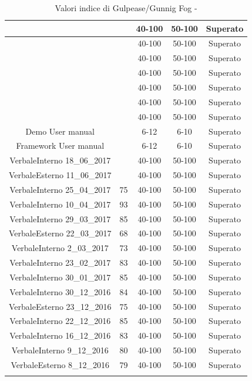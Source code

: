 \begin{longtable}{|c|c|c|c|c|}
	\hline \NormeDiProgetto{} &  & 40-100 & 50-100 & Superato\\
	\hline \PianoDiProgetto{} &  & 40-100 & 50-100 & Superato \\
	\hline \PianoDiQualifica{} &  & 40-100 & 50-100 & Superato \\
	\hline \AnalisiDeiRequisiti{} &  & 40-100 & 50-100 & Superato \\
	\hline \Glossario{} &  & 40-100 & 50-100 & Superato \\
	\hline \SpecificaTecnica{} &  & 40-100 & 50-100 & Superato\\
	\hline \DefinizioneDiProdotto{} &  & 40-100 & 50-100 & Superato\\
	\hline Demo User manual &  & 6-12 & 6-10 & Superato\\
	\hline Framework User manual &  & 6-12 & 6-10 & Superato\\
	\hline VerbaleInterno 18\_06\_2017 &  & 40-100 & 50-100 & Superato \\
	\hline VerbaleEsterno 11\_06\_2017 &  & 40-100 & 50-100 & Superato \\
	\hline VerbaleInterno 25\_04\_2017 & 75 & 40-100 & 50-100 & Superato \\
	\hline VerbaleInterno 10\_04\_2017 & 93 & 40-100 & 50-100 & Superato \\
	\hline VerbaleInterno 29\_03\_2017 & 85 & 40-100 & 50-100 & Superato \\
	\hline VerbaleEsterno 22\_03\_2017 & 68 & 40-100 & 50-100 & Superato \\
	\hline VerbaleInterno 2\_03\_2017 & 73 & 40-100 & 50-100 & Superato \\
	\hline VerbaleInterno 23\_02\_2017 & 83 & 40-100 & 50-100 & Superato \\
	\hline VerbaleInterno 30\_01\_2017 & 85 & 40-100 & 50-100 & Superato \\
	\hline VerbaleInterno 30\_12\_2016 & 84 & 40-100 & 50-100 & Superato \\
	\hline VerbaleEsterno 23\_12\_2016 & 75 & 40-100 & 50-100 & Superato \\
	\hline VerbaleInterno 22\_12\_2016 & 85 & 40-100 & 50-100 & Superato \\
	\hline VerbaleInterno 16\_12\_2016 & 83 & 40-100 & 50-100 & Superato \\
	\hline VerbaleInterno 9\_12\_2016 & 80 & 40-100 & 50-100 & Superato \\
	\hline VerbaleEsterno 8\_12\_2016 & 79 & 40-100 & 50-100 & Superato \\
	\hline
	\caption{Valori indice di Gulpease/Gunnig Fog - \RA{}}
\end{longtable}


